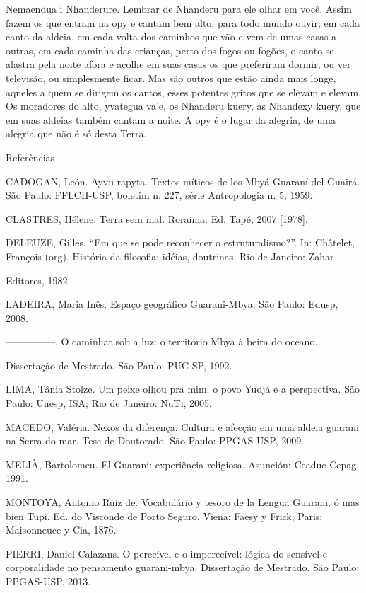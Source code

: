 \documentclass{article}
\begin{document}
Nemaendua i Nhanderure. Lembrar de Nhanderu para ele olhar em voc\^e.
Assim fazem os que entram na opy e cantam bem alto, para todo mundo
ouvir; em cada canto da aldeia, em cada volta dos caminhos que v\~ao e
vem de umas casas a outras, em cada caminha das crian\c{c}as, perto dos
fogos ou fog\~oes, o canto se alastra pela noite afora e acolhe em suas
casas os que preferiram dormir, ou ver televis\~ao, ou simplesmente
ficar. Mas s\~ao outros que est\~ao ainda mais longe, aqueles a quem se
dirigem os cantos, esses potentes gritos que se elevam e elevam. Os
moradores do alto, yvategua va{\textquoteright}e, os Nhanderu kuery, as
Nhandexy kuery, que em suas aldeias tamb\'em cantam a noite. A opy \'e
o lugar da alegria, de uma alegria que n\~ao \'e s\'o desta Terra. 

Refer\^encias

CADOGAN, Le\'on. Ayvu rapyta. Textos m\'iticos de los Mby\'a-Guaran\'i
del Guair\'a. S\~ao Paulo: FFLCH-USP, boletim n. 227, s\'erie
Antropologia n. 5, 1959.

CLASTRES, H\'elene. Terra sem mal. Roraima: Ed. Tap\'e, 2007 [1978].

DELEUZE, Gilles. {\textquotedblleft}Em que se pode reconhecer o
estruturalismo?{\textquotedblright}. In: Ch\^atelet, Fran\c{c}ois 
(org). Hist\'oria da filosofia: id\'eias, doutrinas. Rio de Janeiro:
Zahar

Editores, 1982.

LADEIRA, Maria In\^es. Espa\c{c}o geogr\'afico Guarani-Mbya. S\~ao
Paulo: Edusp, 2008.

{}---{}---{}---{}---{}---. O caminhar sob a luz: o territ\'orio Mbya \`a
beira do oceano. 

Disserta\c{c}\~ao de Mestrado. S\~ao Paulo: PUC-SP, 1992.

LIMA, T\^ania Stolze. Um peixe olhou pra mim: o povo Yudj\'a e a
perspectiva. S\~ao Paulo: Unesp, ISA; Rio de Janeiro: NuTi, 2005.

MACEDO, Val\'eria. Nexos da diferen\c{c}a. Cultura e afec\c{c}\~ao em
uma aldeia guarani na Serra do mar. Tese de Doutorado. S\~ao Paulo:
PPGAS-USP, 2009.

MELI\`A, Bartolomeu. El Guarani: experi\^encia religiosa. Asunci\'on:
Ceaduc-Cepag, 1991.

MONTOYA, Antonio Ruiz de. Vocabul\'ario y tesoro de la Lengua Guarani,
\'o mas bien Tupi. Ed. do Visconde de Porto Seguro. Viena: Faesy y
Frick; Paris: Maisonneuce y Cia, 1876.

PIERRI, Daniel Calazans. O perec\'ivel e o imperec\'ivel: l\'ogica do
sens\'ivel e corporalidade no pensamento guarani-mbya.
Disserta\c{c}\~ao de Mestrado. S\~ao Paulo: PPGAS-USP, 2013.
\end{document}
